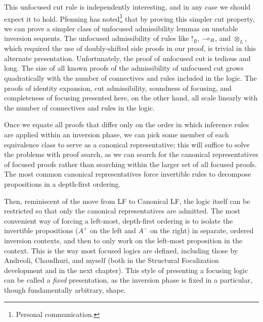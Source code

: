 This unfocused cut rule is independently interesting, and in any case
we should expect it to hold. Pfenning has noted\footnote{Personal
  communication.} that by proving this simpler cut property, we can
prove a simpler class of unfocused admissibility lemmas on unstable
inversion sequents. The unfocused admissibility of rules like ${!}_R$,
${\multimap}_R$, and ${\otimes}_L$, which required the use of
doubly-shifted side proofs in our proof, is trivial in this alternate
presentation.  Unfortunately, the proof of unfocused cut is tedious
and long. The size of all known proofs of the admissibility of
unfocused cut grows quadratically with the number of connectives and
rules included in the logic. The proofs of identity expansion, cut
admissibility, soundness of focusing, and completeness of focusing
presented here, on the other hand, all scale linearly with the number
of connectives and rules in the logic.

%

Once we equate all proofs that differ only on the order
in which inference rules are applied within an inversion phase, 
we can pick some member of
each equivalence class
to serve as a canonical representative; this will suffice
to solve the problems with proof search, as we can search for 
the canonical representatives of focused proofs rather than searching
within the larger set of all focused proofs. The most common canonical
representatives force invertible rules to decompose propositions 
in a depth-first ordering. 

Then, reminiscent of the move from LF to Canonical LF, the logic
itself can be restricted so that only the canonical representatives
are admitted. The most convenient way of forcing a left-most,
depth-first ordering is to isolate the invertible propositions ($A^+$
on the left and $A^-$ on the right) in separate, ordered inversion
contexts, and then to only work on the left-most proposition in the
context. This is the way most focused logics are defined, including
those by Andreoli, Chaudhuri, and myself (both in the Structural
Focalization development and in the next chapter). This style of 
presenting a focusing logic can be called a {\it fixed} presentation,
as the inversion phase is fixed in a particular, though
fundamentally arbitrary, shape. 

